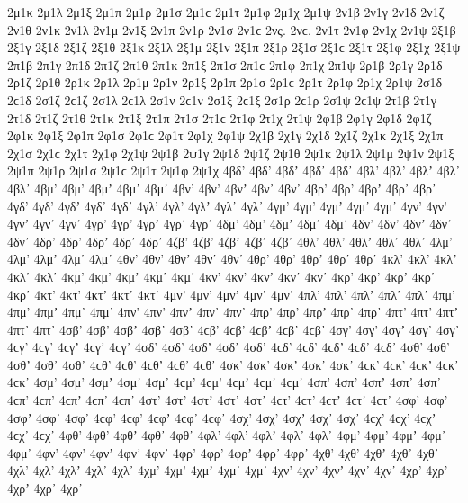{2μ1κ 
2μ1λ 
2μ1ξ 
2μ1π 
2μ1ρ 
2μ1σ 2μ1ϲ 
2μ1τ 
2μ1φ 
2μ1χ 
2μ1ψ 
%
2ν1β 
2ν1γ 
2ν1δ 
2ν1ζ 
2ν1θ 
2ν1κ 
2ν1λ 
2ν1μ 
2ν1ξ 
2ν1π 
2ν1ρ 
2ν1σ 2ν1ϲ 
2νς. 2νϲ. 
2ν1τ 
2ν1φ 
2ν1χ 
2ν1ψ 
%
2ξ1β 
2ξ1γ 
2ξ1δ 
2ξ1ζ 
2ξ1θ 
2ξ1κ 
2ξ1λ 
2ξ1μ 
2ξ1ν 
2ξ1π 
2ξ1ρ 
2ξ1σ 2ξ1ϲ 
2ξ1τ 
2ξ1φ 
2ξ1χ 
2ξ1ψ 
%
2π1β 
2π1γ 
2π1δ 
2π1ζ 
2π1θ 
2π1κ 
2π1ξ 
2π1σ 2π1ϲ 
2π1φ 
2π1χ 
2π1ψ 
%
2ρ1β 
2ρ1γ 
2ρ1δ 
2ρ1ζ 
2ρ1θ 
2ρ1κ 
2ρ1λ 
2ρ1μ 
2ρ1ν 
2ρ1ξ 
2ρ1π 
2ρ1σ 2ρ1ϲ 
2ρ1τ 
2ρ1φ 
2ρ1χ 
2ρ1ψ 
%
2σ1δ 2ϲ1δ   %
2σ1ζ 2ϲ1ζ 
2σ1λ 2ϲ1λ 
2σ1ν 2ϲ1ν 
2σ1ξ 2ϲ1ξ 
2σ1ρ 2ϲ1ρ 
2σ1ψ 2ϲ1ψ 
%
2τ1β 
2τ1γ 
2τ1δ 
2τ1ζ 
2τ1θ 
2τ1κ 
2τ1ξ 
2τ1π 
2τ1σ 2τ1ϲ 
2τ1φ 
2τ1χ 
2τ1ψ 
%
2φ1β 
2φ1γ 
2φ1δ 
2φ1ζ 
2φ1κ 
2φ1ξ 
2φ1π 
2φ1σ 2φ1ϲ 
2φ1τ 
2φ1χ 
2φ1ψ 
%
2χ1β 
2χ1γ 
2χ1δ 
2χ1ζ 
2χ1κ 
2χ1ξ 
2χ1π 
2χ1σ 2χ1ϲ 
2χ1τ 
2χ1φ 
2χ1ψ 
%
2ψ1β 
2ψ1γ 
2ψ1δ 
2ψ1ζ 
2ψ1θ 
2ψ1κ 
2ψ1λ 
2ψ1μ 
2ψ1ν 
2ψ1ξ 
2ψ1π 
2ψ1ρ 
2ψ1σ 2ψ1ϲ 
2ψ1τ 
2ψ1φ 
2ψ1χ 
4βδ' 4βδ’ 4βδʼ 4βδ᾽ 4βδ᾿ 
4βλ' 4βλ’ 4βλʼ 4βλ᾽ 4βλ᾿ 
4βμ' 4βμ’ 4βμʼ 4βμ᾽ 4βμ᾿ 
4βν' 4βν’ 4βνʼ 4βν᾽ 4βν᾿ 
4βρ' 4βρ’ 4βρʼ 4βρ᾽ 4βρ᾿ 
%
4γδ' 4γδ’ 4γδʼ 4γδ᾽ 4γδ᾿ 
4γλ' 4γλ’ 4γλʼ 4γλ᾽ 4γλ᾿ 
4γμ' 4γμ’ 4γμʼ 4γμ᾽ 4γμ᾿ 
4γν' 4γν’ 4γνʼ 4γν᾽ 4γν᾿ 
4γρ' 4γρ’ 4γρʼ 4γρ᾽ 4γρ᾿ 
%
4δμ' 4δμ’ 4δμʼ 4δμ᾽ 4δμ᾿ 
4δν' 4δν’ 4δνʼ 4δν᾽ 4δν᾿ 
4δρ' 4δρ’ 4δρʼ 4δρ᾽ 4δρ᾿ 
%
4ζβ' 4ζβ’ 4ζβʼ 4ζβ᾽ 4ζβ᾿ 
%
4θλ' 4θλ’ 4θλʼ 4θλ᾽ 4θλ᾿ 
4λμ' 4λμ’ 4λμʼ 4λμ᾽ 4λμ᾿ 
4θν' 4θν’ 4θνʼ 4θν᾽ 4θν᾿ 
4θρ' 4θρ’ 4θρʼ 4θρ᾽ 4θρ᾿ 
%
4κλ' 4κλ’ 4κλʼ 4κλ᾽ 4κλ᾿ 
4κμ' 4κμ’ 4κμʼ 4κμ᾽ 4κμ᾿ 
4κν' 4κν’ 4κνʼ 4κν᾽ 4κν᾿ 
4κρ' 4κρ’ 4κρʼ 4κρ᾽ 4κρ᾿ 
4κτ' 4κτ’ 4κτʼ 4κτ᾽ 4κτ᾿ 
%
4μν' 4μν’ 4μνʼ 4μν᾽ 4μν᾿ 
%
4πλ' 4πλ’ 4πλʼ 4πλ᾽ 4πλ᾿ 
4πμ' 4πμ’ 4πμʼ 4πμ᾽ 4πμ᾿ 
4πν' 4πν’ 4πνʼ 4πν᾽ 4πν᾿ 
4πρ' 4πρ’ 4πρʼ 4πρ᾽ 4πρ᾿ 
4πτ' 4πτ’ 4πτʼ 4πτ᾽ 4πτ᾿ 
%
4σβ' 4σβ’ 4σβʼ 4σβ᾽ 4σβ᾿ 4ϲβ' 4ϲβ’ 4ϲβʼ 4ϲβ᾽ 4ϲβ᾿ 
4σγ' 4σγ’ 4σγʼ 4σγ᾽ 4σγ᾿ 4ϲγ' 4ϲγ’ 4ϲγʼ 4ϲγ᾽ 4ϲγ᾿ 
4σδ' 4σδ’ 4σδʼ 4σδ᾽ 4σδ᾿ 4ϲδ' 4ϲδ’ 4ϲδʼ 4ϲδ᾽ 4ϲδ᾿ 
4σθ' 4σθ’ 4σθʼ 4σθ᾽ 4σθ᾿ 4ϲθ' 4ϲθ’ 4ϲθʼ 4ϲθ᾽ 4ϲθ᾿ 
4σκ' 4σκ’ 4σκʼ 4σκ᾽ 4σκ᾿ 4ϲκ' 4ϲκ’ 4ϲκʼ 4ϲκ᾽ 4ϲκ᾿ 
4σμ' 4σμ’ 4σμʼ 4σμ᾽ 4σμ᾿ 4ϲμ' 4ϲμ’ 4ϲμʼ 4ϲμ᾽ 4ϲμ᾿ 
4σπ' 4σπ’ 4σπʼ 4σπ᾽ 4σπ᾿ 4ϲπ' 4ϲπ’ 4ϲπʼ 4ϲπ᾽ 4ϲπ᾿ 
4στ' 4στ’ 4στʼ 4στ᾽ 4στ᾿ 4ϲτ' 4ϲτ’ 4ϲτʼ 4ϲτ᾽ 4ϲτ᾿ 
4σφ' 4σφ’ 4σφʼ 4σφ᾽ 4σφ᾿ 4ϲφ' 4ϲφ’ 4ϲφʼ 4ϲφ᾽ 4ϲφ᾿ 
4σχ' 4σχ’ 4σχʼ 4σχ᾽ 4σχ᾿ 4ϲχ' 4ϲχ’ 4ϲχʼ 4ϲχ᾽ 4ϲχ᾿ 
%
4φθ' 4φθ’ 4φθʼ 4φθ᾽ 4φθ᾿ 
4φλ' 4φλ’ 4φλʼ 4φλ᾽ 4φλ᾿ 
4φμ' 4φμ’ 4φμʼ 4φμ᾽ 4φμ᾿ 
4φν' 4φν’ 4φνʼ 4φν᾽ 4φν᾿ 
4φρ' 4φρ’ 4φρʼ 4φρ᾽ 4φρ᾿ 
%
4χθ' 4χθ’ 4χθʼ 4χθ᾽ 4χθ᾿ 
4χλ' 4χλ’ 4χλʼ 4χλ᾽ 4χλ᾿ 
4χμ' 4χμ’ 4χμʼ 4χμ᾽ 4χμ᾿ 
4χν' 4χν’ 4χνʼ 4χν᾽ 4χν᾿ 
4χρ' 4χρ’ 4χρʼ 4χρ᾽ 4χρ᾿ 
}
